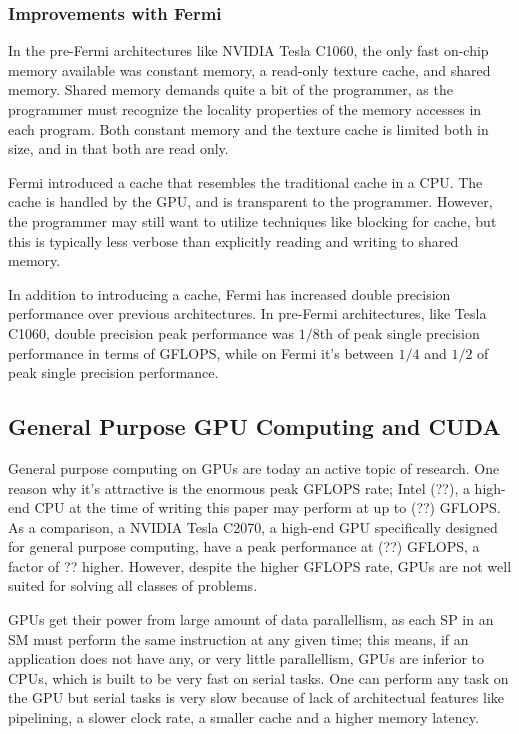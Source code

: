 \subsubsection{Improvements with Fermi}
In the pre-Fermi architectures like NVIDIA Tesla C1060, the only fast on-chip memory available was constant memory, a read-only texture cache, and shared memory. Shared memory demands quite a bit of the programmer, as the programmer must recognize the locality properties of the memory accesses in each program. Both constant memory and the texture cache is limited both in size, and in that both are read only.

Fermi introduced a cache that resembles the traditional cache in a CPU. The cache is handled by the GPU, and is transparent to the programmer. However, the programmer may still want to utilize techniques like blocking for cache, but this is typically less verbose than explicitly reading and writing to shared memory. 

In addition to introducing a cache, Fermi has increased double precision performance over previous architectures.\cite{fermiwhitepaper} In pre-Fermi architectures, like Tesla C1060, double precision peak performance was $1/8$th of peak single precision performance in terms of GFLOPS, while on Fermi it's between $1/4$ and $1/2$ of peak single precision performance.\cite{fermidoubleprecision}

\subsection{General Purpose GPU Computing and CUDA}
General purpose computing on GPUs are today an active topic of research. One reason why it's attractive is the enormous peak GFLOPS rate; Intel (??), a high-end CPU at the time of writing this paper may perform at up to (??) GFLOPS\cite{intel??specs}. As a comparison, a NVIDIA Tesla C2070, a high-end GPU specifically designed for general purpose computing, have a peak performance at (??) GFLOPS, a factor of ?? higher. However, despite the higher GFLOPS rate, GPUs are not well suited for solving all classes of problems. 

GPUs get their power from large amount of data parallellism, as each SP in an SM must perform the same instruction at any given time; this means, if an application does not have any, or very little parallellism, GPUs are inferior to CPUs, which is built to be very fast on serial tasks. One can perform any task on the GPU but serial tasks is very slow because of lack of architectual features like pipelining, a slower clock rate, a smaller cache and a higher memory latency.

